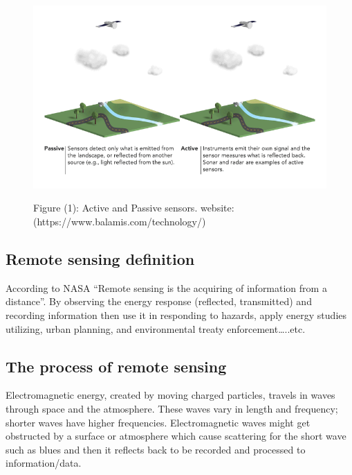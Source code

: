 \documentclass[
  letterpaper,
  DIV=11,
  numbers=noendperiod]{scrreprt}
\begin{document}
\begin{figure}

{\centering 

\href{https://www.balamis.com/technology/}{\includegraphics[width=5.20833in,height=\textheight]{active and passive sensors .gif}}

}

\caption{Figure (1): Active and Passive sensors. website:
(https://www.balamis.com/technology/)}

\end{figure}

\hypertarget{remote-sensing-definition}{%
\subsection{Remote sensing definition}\label{remote-sensing-definition}}

According to NASA ``Remote sensing is the acquiring of information from
a distance''. By observing the energy response (reflected, transmitted)
and recording information then use it in responding to hazards, apply
energy studies utilizing, urban planning, and environmental treaty
enforcement\ldots..etc.

\hypertarget{the-process-of-remote-sensing}{%
\subsection{The process of remote
sensing}\label{the-process-of-remote-sensing}}

Electromagnetic energy, created by moving charged particles, travels in
waves through space and the atmosphere. These waves vary in length and
frequency; shorter waves have higher frequencies. Electromagnetic waves
might get obstructed by a surface or atmosphere which cause scattering
for the short wave such as blues and then it reflects back to be
recorded and processed to information/data.
\end{document}
